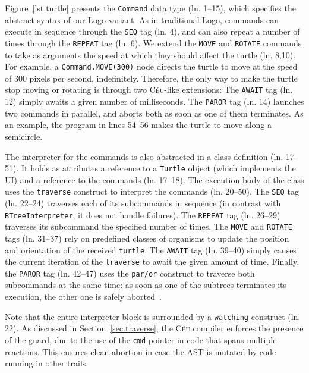 \documentclass{sig-alternate}
\newcommand{\CEU}{\textsc{C\'{e}u}\xspace}
\newcommand{\code}[1] {{\small{\texttt{#1}}}}
\begin{document}
Figure~\ref{lst.turtle} presents the \code{Command} data type (ln. 1--15), 
which specifies the abstract syntax of our Logo variant.
As in traditional Logo, commands can execute in sequence through the \code{SEQ} 
tag (ln. 4), and can also repeat a number of times through the \code{REPEAT} 
tag (ln. 6).
%
We extend the \code{MOVE} and \code{ROTATE} commands to take as arguments the 
speed at which they should affect the turtle (ln. 8,10).
For example, a \code{Command.MOVE(300)} node directs the turtle to move at the 
speed of 300 pixels per second, indefinitely.
%
Therefore, the only way to make the turtle stop moving or rotating is through 
two \CEU-like extensions:
The \code{AWAIT} tag (ln. 12) simply awaits a given number of milliseconds.
The \code{PAROR} tag (ln. 14) launches two commands in parallel, and aborts 
both as soon as one of them terminates.
%
As an example, the program in lines 54--56 makes the turtle to move along a 
semicircle.

The interpreter for the commands is also abstracted in a class definition 
(ln. 17--51).
%
It holds as attributes a reference to a \code{Turtle} object (which implements 
the UI) and a reference to the commands (ln. 17--18).
The execution body of the class uses the \code{traverse} construct to interpret 
the commands (ln. 20--50).
%
The \code{SEQ} tag (ln. 22--24) traverses each of its subcommands in sequence 
(in contrast with \code{BTreeInterpreter}, it does not handle failures).
%
The \code{REPEAT} tag (ln. 26--29) traverses its subcommand the specified number 
of times.
%
The \code{MOVE} and \code{ROTATE} tags (ln. 31--37) rely on predefined classes 
of organisms to update the position and orientation of the received 
\code{turtle}.
%
The \code{AWAIT} tag (ln. 39--40) simply causes the current iteration of the 
\code{traverse} to await the given amount of time.
%
Finally, the \code{PAROR} tag (ln. 42--47) uses the \code{par/or} construct
to traverse both subcommands at the same time:
as soon as one of the subtrees terminates its execution, the other one is 
safely aborted~\cite{ceu.sensys13}.

Note that the entire interpreter block is surrounded by a \code{watching}
construct (ln. 22).
As discussed in Section~\ref{sec.traverse}, the \CEU compiler enforces the 
presence of the guard, due to the use of the \code{cmd} pointer in code that 
spans multiple reactions. This ensures clean abortion in case the AST is 
mutated by code running in other trails.
\end{document}
